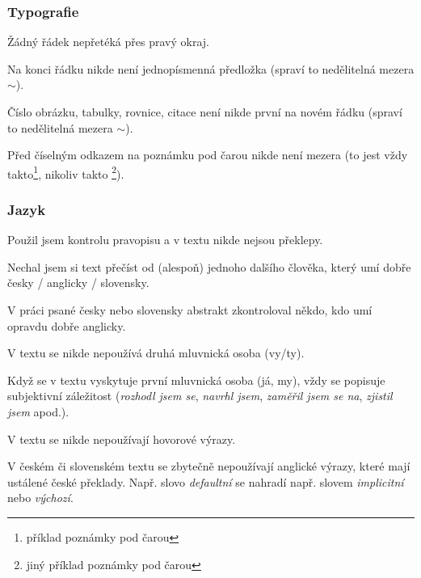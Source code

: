 \subsubsection*{Typografie}
\begin{checklist}
	\item Žádný řádek nepřetéká přes pravý okraj.
	\item Na konci řádku nikde není jednopísmenná předložka (spraví to nedělitelná mezera $\sim$).
	\item Číslo obrázku, tabulky, rovnice, citace není nikde první na novém řádku (spraví to nedělitelná mezera $\sim$).
	\item Před číselným odkazem na poznámku pod čarou nikde není mezera (to jest vždy takto\footnote{příklad poznámky pod čarou}, nikoliv takto \footnote{jiný příklad poznámky pod čarou}).
\end{checklist}

\subsubsection*{Jazyk}
\begin{checklist}
    \item Použil jsem kontrolu pravopisu a v textu nikde nejsou překlepy.
	\item Nechal jsem si text přečíst od (alespoň) jednoho dalšího člověka, který umí dobře česky / anglicky / slovensky.
	\item V práci psané česky nebo slovensky abstrakt zkontroloval někdo, kdo umí opravdu dobře anglicky.
	\item V textu se nikde nepoužívá druhá mluvnická osoba (vy/ty).
	\item Když se v textu vyskytuje první mluvnická osoba (já, my), vždy se popisuje subjektivní záležitost (\textit{rozhodl jsem se}, \textit{navrhl jsem}, \textit{zaměřil jsem se na}, \textit{zjistil jsem} apod.).
	\item V textu se nikde nepoužívají hovorové výrazy.
	\item V českém či slovenském textu se zbytečně nepoužívají anglické výrazy, které mají ustálené české překlady. Např. slovo \textit{defaultní} se nahradí např. slovem \textit{implicitní} nebo \textit{výchozí}.
\end{checklist}

